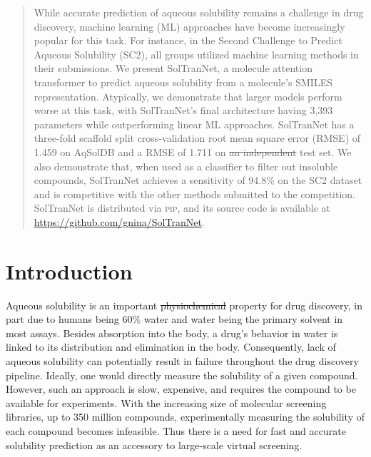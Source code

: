 \documentclass[journal=jcim,manuscript=applicationnotes]{achemso} %
\providecommand{\DIFaddtex}[1]{{\protect\color{blue}\uwave{#1}}} %
\providecommand{\DIFdeltex}[1]{{\protect\color{red}\sout{#1}}}                      %
\providecommand{\DIFaddbegin}{} %
\providecommand{\DIFaddend}{} %
\providecommand{\DIFdelbegin}{} %
\providecommand{\DIFdelend}{} %
\providecommand{\DIFadd}[1]{\texorpdfstring{\DIFaddtex{#1}}{#1}} %
\providecommand{\DIFdel}[1]{\texorpdfstring{\DIFdeltex{#1}}{}} %
\begin{document}
\begin{abstract}
While accurate prediction of aqueous solubility remains a challenge in drug discovery, machine learning (ML) approaches have become increasingly popular for this task.
For instance, in the Second Challenge to Predict Aqueous Solubility (SC2), all groups utilized machine learning methods in their submissions.
We present SolTranNet, a molecule attention transformer to predict aqueous solubility from a molecule's SMILES representation.
Atypically, we demonstrate that larger models perform worse at this task, with SolTranNet's final architecture having 3,393 parameters while outperforming linear ML approaches.
SolTranNet has a three-fold scaffold split cross-validation root mean square error (RMSE) of 1.459 on AqSolDB and a RMSE of 1.711 on \DIFdelbegin \DIFdel{an independent }\DIFdelend \DIFaddbegin \DIFadd{a withheld }\DIFaddend test set.
We also demonstrate that, when used as a classifier to filter out insoluble compounds, SolTranNet achieves a sensitivity of 94.8\% on the SC2 dataset and is competitive with the other methods submitted to the competition.
SolTranNet is distributed via \textsc{pip}, and its source code is available at \url{https://github.com/gnina/SolTranNet}.

\end{abstract}


\section{Introduction}
Aqueous solubility is an important \DIFdelbegin \DIFdel{physiochemical }\DIFdelend \DIFaddbegin \DIFadd{physicochemical }\DIFaddend property for drug discovery, in part due to humans being 60\% water\cite{HumanWater} and water being the primary solvent in most assays. 
Besides absorption into the body, a drug's behavior in water is linked to its distribution and elimination in the body.
Consequently, lack of aqueous solubility can potentially result in failure throughout the drug discovery pipeline.\cite{LIPINSKI1997,DI2006446,EKINS2002305}
Ideally, one would directly measure the solubility of a given compound.
However, such an approach is slow, expensive, and requires the compound to be available for experiments.
With the increasing size of molecular screening libraries, up to 350 million compounds,\cite{NatureVS} experimentally measuring the solubility of each compound becomes infeasible.
Thus there is a need for fast and accurate solubility prediction as an accessory to large-scale virtual screening.
\end{document}
